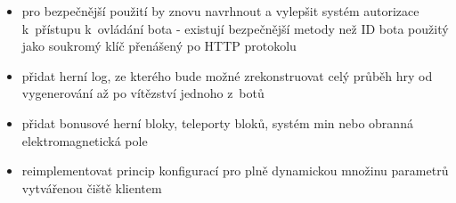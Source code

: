 {\begin{itemize}
 \item pro bezpečnější použití by znovu navrhnout a vylepšit systém autorizace k~přístupu k~ovládání bota - existují bezpečnější metody než ID bota použitý jako soukromý klíč přenášený po HTTP protokolu
 \item přidat herní log, ze kterého bude možné zrekonstruovat celý průběh hry od vygenerování až po vítězství jednoho z~botů  
 \item přidat bonusové herní bloky, teleporty bloků, systém min nebo obranná elektromagnetická pole
 \item reimplementovat princip konfigurací pro plně dynamickou množinu parametrů vytvářenou čiště klientem
\end{itemize}
}